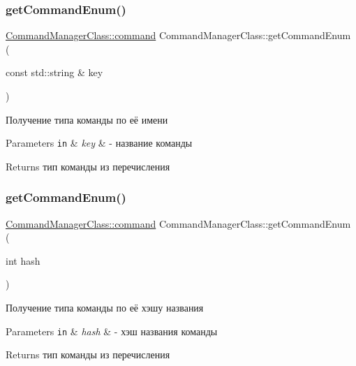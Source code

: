 \subsubsection{\texorpdfstring{get\+Command\+Enum()}{getCommandEnum()}\hspace{0.1cm}{\footnotesize\ttfamily [1/2]}}
{\footnotesize\ttfamily \hyperlink{class_command_manager_class_aff5b4b6301c24b585b22c6abaf4f3131}{Command\+Manager\+Class\+::command} Command\+Manager\+Class\+::get\+Command\+Enum (\begin{DoxyParamCaption}\item[{const std\+::string \&}]{key }\end{DoxyParamCaption})}



Получение типа команды по её имени 


\begin{DoxyParams}[1]{Parameters}
\mbox{\tt in}  & {\em key} & -\/ название команды \\
\hline
\end{DoxyParams}
\begin{DoxyReturn}{Returns}
тип команды из перечисления 
\end{DoxyReturn}
\mbox{\label{class_command_manager_class_a18080e9ab4d0890282cde8dd668dc87e}} 
\subsubsection{\texorpdfstring{get\+Command\+Enum()}{getCommandEnum()}\hspace{0.1cm}{\footnotesize\ttfamily [2/2]}}
{\footnotesize\ttfamily \hyperlink{class_command_manager_class_aff5b4b6301c24b585b22c6abaf4f3131}{Command\+Manager\+Class\+::command} Command\+Manager\+Class\+::get\+Command\+Enum (\begin{DoxyParamCaption}\item[{int}]{hash }\end{DoxyParamCaption})}



Получение типа команды по её хэшу названия 


\begin{DoxyParams}[1]{Parameters}
\mbox{\tt in}  & {\em hash} & -\/ хэш названия команды \\
\hline
\end{DoxyParams}
\begin{DoxyReturn}{Returns}
тип команды из перечисления 
\end{DoxyReturn}
\mbox{\label{class_command_manager_class_a5086ba410f5bb7af25db58e9c5b16d27}} 
